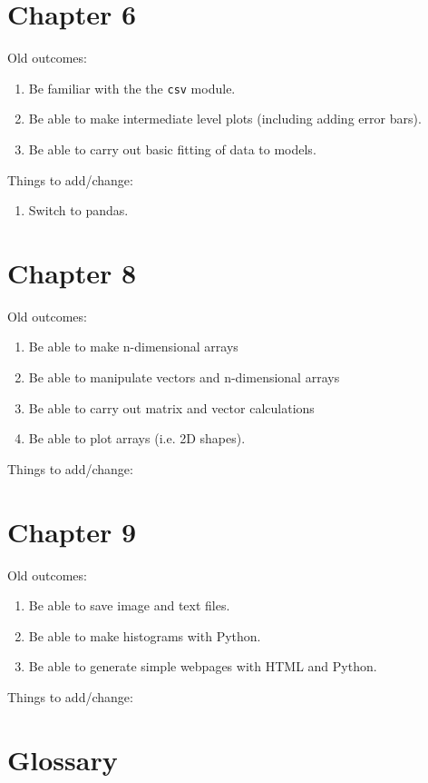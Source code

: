 \section*{Chapter 6}

\noindent Old outcomes:
\begin{enumerate}
\item Be familiar with the the {\tt csv} module.
\item Be able to make intermediate level plots (including adding error bars).
\item Be able to carry out basic fitting of data to models.
\end{enumerate}

\noindent Things to add/change:

\begin{enumerate}
    \item Switch to pandas.
\end{enumerate}

\section*{Chapter 8}

\noindent Old outcomes:
\begin{enumerate}
\item Be able to make n-dimensional arrays
\item Be able to manipulate vectors and n-dimensional arrays
\item Be able to carry out matrix and vector calculations
\item Be able to plot arrays (i.e. 2D shapes).
\end{enumerate}

\noindent Things to add/change:

\section*{Chapter 9}

\noindent Old outcomes:
\begin{enumerate}
\item Be able to save image and text files.
\item Be able to make histograms with Python.
\item Be able to generate simple webpages with HTML and Python.
\end{enumerate}

\noindent Things to add/change:

\section*{Glossary}

